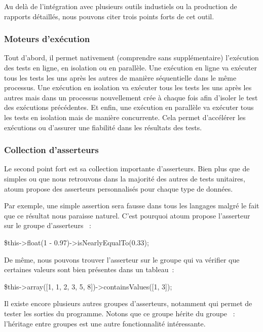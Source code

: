 Au delà de l'intégration avec plusieurs outils industiels ou la production de
rapports détaillés, nous pouvons citer trois points forts de cet outil.

\subsubsection{Moteurs d'exécution}

Tout d'abord, il permet nativement (comprendre sans 
supplémentaire) l'exécution des tests en ligne, en isolation ou en parallèle.
Une exécution en ligne va exécuter tous les tests les uns après les autres de
manière séquentielle dans le même processus. Une exécution en isolation va
exécuter tous les tests les uns après les autres mais dans un processus
nouvellement crée à chaque fois afin d'isoler le test des exécutions
précédentes. Et enfin, une exécution en parallèle va exécuter tous les tests en
isolation mais de manière concurrente. Cela permet d'accélérer les exécutions ou
d'assurer une fiabilité dans les résultats des tests.

\subsubsection{Collection d'asserteurs}

Le second point fort est sa collection importante d'asserteurs. Bien plus que de
simples  ou  que nous retrouvons dans la
majorité des autres  de tests unitaires, atoum propose des
asserteurs personnalisés pour chaque type de données.

\begin{example}

Par exemple, une simple assertion  sera fausse dans tous
les langages malgré le fait que ce résultat nous paraisse naturel. C'est
pourquoi atoum propose l'asserteur  sur le groupe
d'asserteurs ~:
%
\begin{pre}
\$this->float(1 - 0.97)->isNearlyEqualTo(0.33);
\end{pre}
%
De même, nous pouvons trouver l'asserteur  sur le groupe
 qui va vérifier que certaines valeurs sont bien présentes dans un
tableau~:
%
\begin{pre}
\$this->array([1, 1, 2, 3, 5, 8])->containsValues([1, 3]);
\end{pre}
%
Il existe encore plusieurs autres groupes d'asserteurs, notamment 
qui permet de tester les sorties du programme. Notons que ce groupe hérite du
groupe ~: l'héritage entre groupes est une autre fonctionnalité
intéressante.

\end{example}

